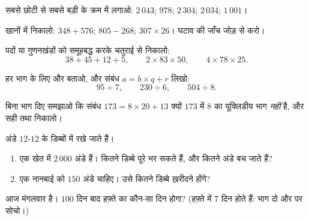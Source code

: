\begin{exercise}[$\star$]\label{exo:g6:wholes:4}
सबसे छोटी से सबसे बड़ी के क्रम में लगाओ: $2\,043$; $978$; $2\,304$; $2\,034$;
$1\,001$।
\end{exercise}

\begin{exercise}[$\star$]\label{exo:g6:wholes:5}
खानों में निकालो: $348 + 576$; \quad $805 - 268$; \quad
$307 \times 26$। घटाव की जाँच जोड़ से करो।
\end{exercise}

\begin{exercise}[$\star$]\label{exo:g6:wholes:6}
पदों या गुणनखंडों को समूहबद्ध करके चतुराई से निकालो:
\[
38 + 45 + 12 + 5, \qquad
2 \times 83 \times 50, \qquad
4 \times 78 \times 25 .
\]
\end{exercise}

\begin{exercise}[$\star$]\label{exo:g6:wholes:7}
हर भाग के लिए  और  बताओ, और संबंध
$a = b \times q + r$ लिखो:
\[
95 \div 7, \qquad
230 \div 6, \qquad
504 \div 8 .
\]
\end{exercise}

\begin{exercise}[$\star$]\label{exo:g6:wholes:8}
बिना भाग दिए समझाओ कि संबंध $173 = 8 \times 20 + 13$ क्यों
$173$ में $8$ का यूक्लिडीय भाग \emph{नहीं} है, और सही  तथा
 निकालो।
\end{exercise}

\begin{exercise}[$\star\star$]\label{exo:g6:wholes:9}
अंडे $12$-$12$ के डिब्बों में रखे जाते हैं।
\begin{enumerate}
  \item एक खेत में $2\,000$ अंडे हैं। कितने डिब्बे पूरे भर सकते
        हैं, और कितने अंडे बच जाते हैं?
  \item एक नानबाई को $150$ अंडे चाहिए। उसे कितने डिब्बे ख़रीदने होंगे?
\end{enumerate}
\end{exercise}

\begin{exercise}[$\star\star$]\label{exo:g6:wholes:10}
आज मंगलवार है। $100$ दिन बाद हफ़्ते का कौन-सा दिन होगा?
(हफ़्ते में $7$ दिन होते हैं: भाग दो और  पर सोचो।)
\end{exercise}

